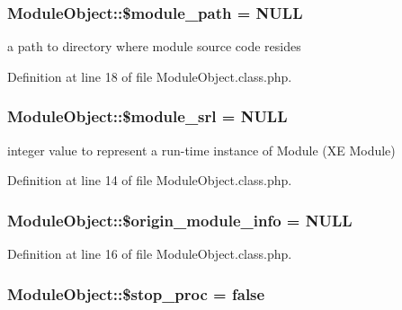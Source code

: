 \hypertarget{classModuleObject_aba24677d5cf457dc33d9af3d8a3b3a14}{
\subsubsection[{\$module\+\_\+path}]{\setlength{\rightskip}{0pt plus 5cm}Module\+Object\+::\$module\+\_\+path = N\+U\+L\+L}}\label{classModuleObject_aba24677d5cf457dc33d9af3d8a3b3a14}


a path to directory where module source code resides 



Definition at line 18 of file Module\+Object.\+class.\+php.

\hypertarget{classModuleObject_a0da50016ddc31513f563206fdf6f413d}{
\subsubsection[{\$module\+\_\+srl}]{\setlength{\rightskip}{0pt plus 5cm}Module\+Object\+::\$module\+\_\+srl = N\+U\+L\+L}}\label{classModuleObject_a0da50016ddc31513f563206fdf6f413d}


integer value to represent a run-\/time instance of Module (X\+E Module) 



Definition at line 14 of file Module\+Object.\+class.\+php.

\hypertarget{classModuleObject_a6bdf7982a5defc9d618c2dd1b700e876}{
\subsubsection[{\$origin\+\_\+module\+\_\+info}]{\setlength{\rightskip}{0pt plus 5cm}Module\+Object\+::\$origin\+\_\+module\+\_\+info = N\+U\+L\+L}}\label{classModuleObject_a6bdf7982a5defc9d618c2dd1b700e876}


Definition at line 16 of file Module\+Object.\+class.\+php.

\hypertarget{classModuleObject_ad4efa1b4c623247763e4d56f76c5fb1c}{
\subsubsection[{\$stop\+\_\+proc}]{\setlength{\rightskip}{0pt plus 5cm}Module\+Object\+::\$stop\+\_\+proc = false}}\label{classModuleObject_ad4efa1b4c623247763e4d56f76c5fb1c}


